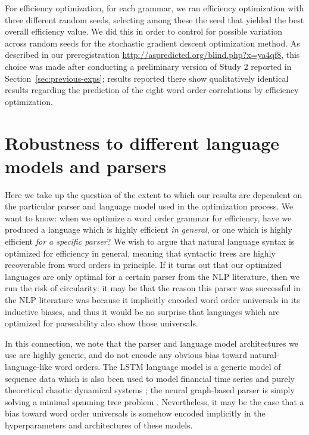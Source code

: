 \documentclass[10pt,twoside,lineno]{article}
\begin{document}
For efficiency optimization, for each grammar, we ran efficiency optimization with three different random seeds, selecting among these the seed that yielded the best overall efficiency value.
We did this in order to control for possible variation across random seeds for the stochastic gradient descent optimization method.
As described in our preregistration \url{http://aspredicted.org/blind.php?x=ya4qf8}, this choice was made after conducting a preliminary version of Study 2 reported in Section~\ref{sec:previous-exps}; results reported there show qualitatively identical results regarding the prediction of the eight word order correlations by efficiency optimization.




\section{Robustness to different language models and parsers}


Here we take up the question of the extent to which our results are dependent on the particular parser and language model used in the optimization process. We want to know: when we optimize a word order grammar for efficiency, have we produced a language which is highly efficient \emph{in general}, or one which is highly efficient \emph{for a specific parser}? We wish to argue that natural language syntax is optimized for efficiency in general, meaning that syntactic trees are highly recoverable from word orders in principle. If it turns out that our optimized languages are only optimal for a certain parser from the NLP literature, then we run the risk of circularity: it may be that the reason this parser was successful in the NLP literature was because it implicitly encoded word order universals in its inductive biases, and thus it would be no surprise that languages which are optimized for parseability also show those universals.

In this connection, we note that the parser and language model architectures we use are highly generic, and do not encode any obvious bias toward natural-language-like word orders. The LSTM language model is a generic model of sequence data which is also been used to model financial time series \citep{sirignano2018universal} and purely theoretical chaotic dynamical systems \citep{ogunmolu2016nonlinear}; the neural graph-based parser is simply solving a minimal spanning tree problem \citep{mcdonald2005nonprojective}. Nevertheless, it may be the case that a bias toward word order universals is somehow encoded implicitly in the hyperparameters and architectures of these models.
\end{document}
